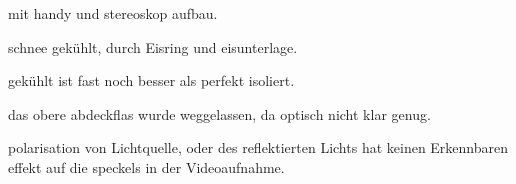 mit handy und stereoskop aufbau.

schnee gekühlt, durch Eisring und eisunterlage.

gekühlt ist fast noch besser als perfekt isoliert.

das obere abdeckflas wurde weggelassen, da optisch nicht klar genug.

polarisation von Lichtquelle, oder des reflektierten Lichts hat keinen Erkennbaren effekt auf die speckels in der Videoaufnahme.
